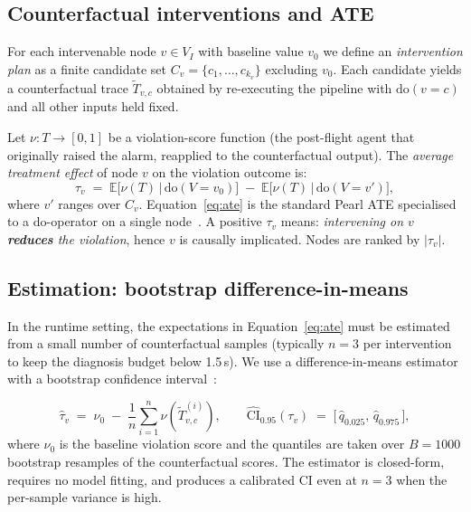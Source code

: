 \documentclass[11pt,letterpaper]{article}
\begin{document}
\subsection{Counterfactual interventions and ATE}
\label{sec:cf}

For each intervenable node $v \in V_I$ with baseline value $v_0$ we
define an \emph{intervention plan} as a finite candidate set
$C_v = \{c_1, \ldots, c_{k_v}\}$ excluding $v_0$.  Each candidate yields
a counterfactual trace $\tilde{T}_{v,c}$ obtained by re-executing the
pipeline with $\mathrm{do}(v = c)$ and all other inputs held fixed.

Let $\nu : T \to [0,1]$ be a violation-score function (the
post-flight agent that originally raised the alarm, reapplied to the
counterfactual output).  The \emph{average treatment effect} of node
$v$ on the violation outcome is:
\begin{equation}
\tau_v \;=\; \mathbb{E}\big[\nu(T) \,\big|\, \mathrm{do}(V = v_0)\big]
        \;-\; \mathbb{E}\big[\nu(T) \,\big|\, \mathrm{do}(V = v')\big],
\label{eq:ate}
\end{equation}
where $v'$ ranges over $C_v$.  Equation~\eqref{eq:ate} is the standard
Pearl ATE specialised to a do-operator on a single
node~\cite{pearl2009causality,pearl1995ate}.  A positive $\tau_v$
means: \emph{intervening on $v$ \textbf{reduces} the violation}, hence
$v$ is causally implicated.  Nodes are ranked by $|\tau_v|$.

\subsection{Estimation: bootstrap difference-in-means}
\label{sec:estimator}

In the runtime setting, the expectations in
Equation~\eqref{eq:ate} must be estimated from a small number of
counterfactual samples (typically $n = 3$ per intervention to keep the
diagnosis budget below 1.5\,s).  We use a difference-in-means estimator
with a bootstrap confidence
interval~\cite{efron1979bootstrap}:

\begin{equation}
\hat{\tau}_v \;=\; \nu_0 \;-\; \frac{1}{n}\sum_{i=1}^{n}\nu(\tilde{T}_{v,c}^{(i)}),
\qquad
\widehat{\mathrm{CI}}_{0.95}(\tau_v) \;=\; \big[\,\widehat{q}_{0.025},\,
                                                \widehat{q}_{0.975}\,\big],
\label{eq:estimator}
\end{equation}
where $\nu_0$ is the baseline violation score and the quantiles are
taken over $B = 1000$ bootstrap resamples of the counterfactual
scores.  The estimator is closed-form, requires no model fitting, and
produces a calibrated CI even at $n = 3$ when the per-sample variance
is high.
\end{document}
